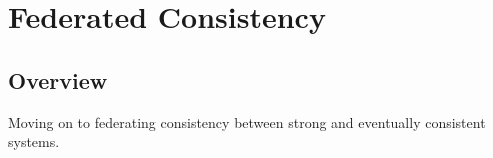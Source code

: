
\renewcommand{\thechapter}{3}

\chapter{Federated Consistency}

\section{Overview}

Moving on to federating consistency between strong and eventually consistent systems. 
